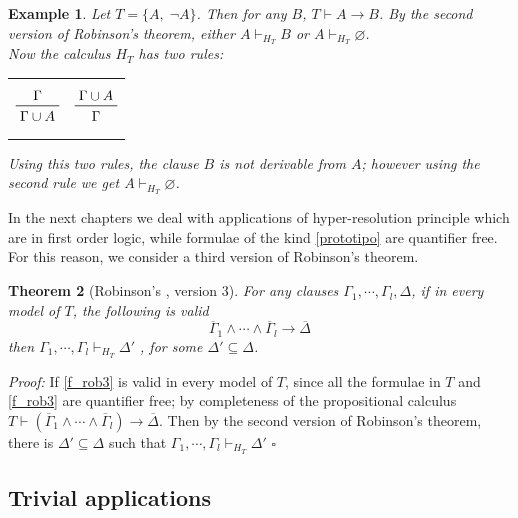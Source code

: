 \documentclass[a4paper,12pt,oneside]{book}
\newtheorem{theorem}{Theorem}[chapter]
\newtheorem{example}[theorem]{Example}
\newcommand*{\QED}{\hfill\ensuremath{\square}}
\let\emptyset\varnothing
\let\e\wedge
\begin{document}
\begin{example} Let $T=\{ A ,\; \neg A \}$. Then for any $B$, $T\vdash A\rightarrow B$.
By the second version of Robinson's theorem, either $ A \vdash_{H_T} B $ or  $ A \vdash_{H_T} \emptyset$. \\Now the calculus $H_T$ has two rules:

\begin{center}
\begin{tabular}{cc}

$$\prftree{\Gamma }  {\Gamma\cup A} 
$$
& \hspace{10mm}
$$\prftree{\Gamma \cup A }  {\Gamma }
$$
\end{tabular}
\end{center}
Using this two rules, the clause $B$ is not derivable from $A$; however using the second rule we get $ A \vdash_{H_T} \emptyset$.
\end{example}
 

In the next chapters we deal with applications of hyper-resolution principle which are in first order logic, while formulae of the kind \ref{prototipo} are quantifier free. For this reason, we consider a third version of Robinson's theorem. 

\begin{theorem}[{Robinson's , version 3}] \label{Robinson3}
For any clauses $\Gamma_1, \cdots ,\Gamma_l , \Delta$, if in every model of $T$, the following is valid 
\begin{equation}\label{f_rob3}
\overline{\Gamma}_1\e\cdots\e\overline{\Gamma}_l \rightarrow \overline{\Delta}
\end{equation}
then  $\Gamma_1, \cdots ,\Gamma_l \vdash_{H_T} \Delta'$ , for some $\Delta' \subseteq \Delta$.
\end{theorem}

\textit{Proof:} If \ref{f_rob3} is valid in every model of $T$, since all the formulae in $T$ and \ref{f_rob3} are quantifier free; by completeness of the propositional calculus $T\vdash (\overline{\Gamma}_1\e\cdots\e\overline{\Gamma}_l )\rightarrow\overline{\Delta}$. Then by the second version of Robinson's theorem, there is $\Delta' \subseteq \Delta$ such that $\Gamma_1, \cdots ,\Gamma_l \vdash_{H_T} \Delta'$ \QED

\newpage
\subsection*{Trivial applications}
	
\end{document}
